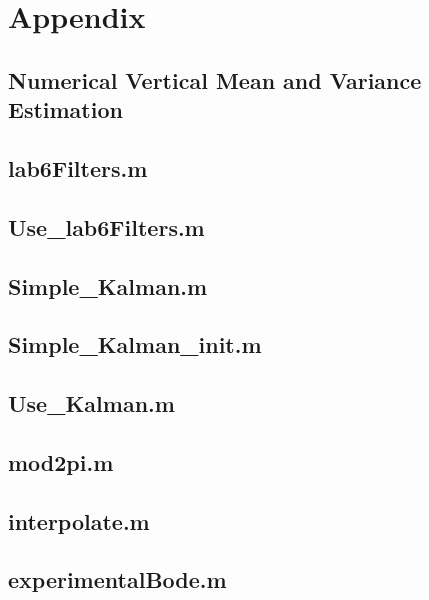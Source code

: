 \documentclass{article}
\theoremstyle{plain}
\theoremstyle{definition}
\theoremstyle{remark}
\begin{document}
\clearpage

\section{Appendix}

\subsection{Numerical Vertical Mean and Variance Estimation}


\subsection{lab6Filters.m}


\subsection{Use\_lab6Filters.m}


\subsection{Simple\_Kalman.m}



\subsection{Simple\_Kalman\_init.m}



\subsection{Use\_Kalman.m}



\subsection{mod2pi.m}



\subsection{interpolate.m}



\subsection{experimentalBode.m}

\end{document}
